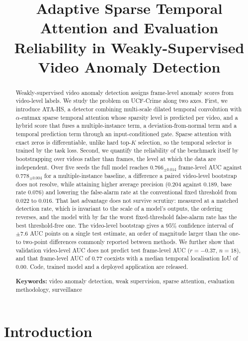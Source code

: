 \documentclass[11pt]{article}
\title{\bfseries Adaptive Sparse Temporal Attention and Evaluation Reliability
in Weakly-Supervised Video Anomaly Detection}
\author{}
\date{}
\begin{document}
\maketitle

\begin{abstract}
Weakly-supervised video anomaly detection assigns frame-level anomaly scores
from video-level labels. We study the problem on UCF-Crime along two axes.
First, we introduce ATA-HS, a detector combining multi-scale dilated temporal
convolution with $\alpha$-entmax sparse temporal attention whose sparsity level
is predicted per video, and a hybrid score that fuses a multiple-instance term,
a deviation-from-normal term and a temporal prediction term through an
input-conditioned gate. Sparse attention with exact zeros is differentiable,
unlike hard top-$K$ selection, so the temporal selector is trained by the task
loss. Second, we quantify the reliability of the benchmark itself by
bootstrapping over videos rather than frames, the level at which the data are
independent. Over five seeds the full model reaches $0.766_{\pm0.014}$ frame-level
AUC against $0.778_{\pm0.004}$ for a multiple-instance baseline, a difference a
paired video-level bootstrap does not resolve, while attaining higher average
precision ($0.204$ against $0.189$, base rate $0.076$) and lowering the
false-alarm rate at the conventional fixed threshold from $0.022$ to $0.016$. That
last advantage does not survive scrutiny: measured at a matched detection rate,
which is invariant to the scale of a model's outputs, the ordering reverses, and
the model with by far the worst fixed-threshold false-alarm rate has the best
threshold-free one. The video-level bootstrap gives a $95\%$ confidence
interval of $\pm7.6$ AUC points on a single test estimate, an order of magnitude
larger than the one- to two-point differences commonly reported between methods. We
further show that validation video-level AUC does not predict test frame-level
AUC ($r=-0.37$, $n=18$), and that frame-level AUC of $0.77$ coexists with a
median temporal localisation IoU of $0.00$. Code, trained model and a deployed
application are released.

\smallskip
\noindent\textbf{Keywords:} video anomaly detection, weak supervision,
sparse attention, evaluation methodology, surveillance
\end{abstract}

\section{Introduction}
\label{sec:intro}
\end{document}
